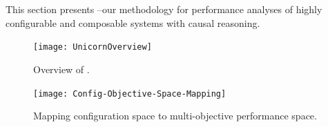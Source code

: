 \section{\ourapproach}
\label{sec:methodology}
% 


This section presents \ourapproach--our methodology for performance analyses of highly configurable and composable systems with causal reasoning. 

\smallskip
\begin{figure}[tp!]
    \centering
    \texttt{[image: UnicornOverview]}
    \caption{\small {Overview of \ourapproach}.}
    \label{fig:overview}
\end{figure}

\begin{figure}[tp!]
    \centering
    \texttt{[image: Config-Objective-Space-Mapping]}
    \caption{\small {Mapping configuration space to multi-objective performance space.}}
    
    \label{fig:config_to_objective_space}
    \vspace{-4mm}
\end{figure}
